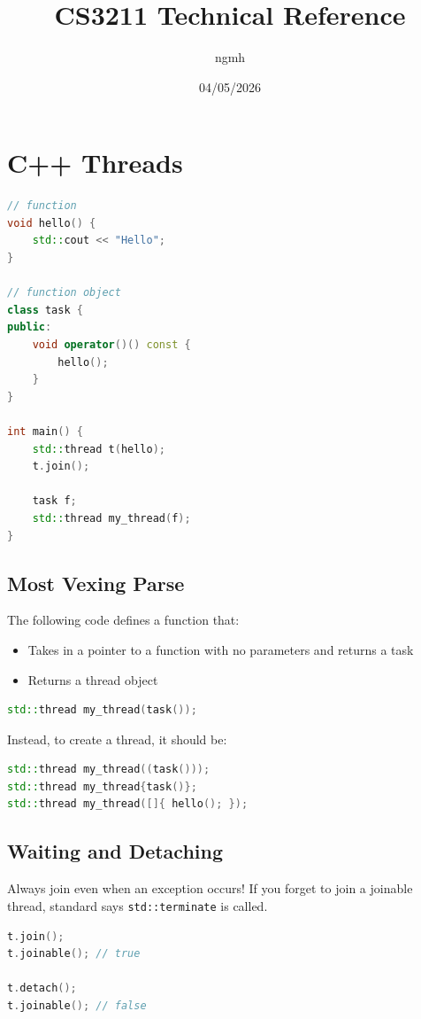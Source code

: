\documentclass{article}
\title{CS3211 Technical Reference}
\author{ngmh}
\date{04/05/2026}
\begin{document}
\large
\maketitle

\section{C++ Threads}
\begin{lstlisting}[language=C++]
// function
void hello() {
    std::cout << "Hello";
}

// function object
class task {
public:
    void operator()() const {
        hello();
    }
}

int main() {
    std::thread t(hello);
    t.join();

    task f;
    std::thread my_thread(f);
}

\end{lstlisting}

\subsection{Most Vexing Parse}
The following code defines a function that:
\begin{itemize}
    \item Takes in a pointer to a function with no parameters and returns a task
    \item Returns a thread object
\end{itemize}
\begin{lstlisting}[language=C++]
std::thread my_thread(task());
\end{lstlisting}

Instead, to create a thread, it should be:
\begin{lstlisting}[language=C++]
std::thread my_thread((task()));
std::thread my_thread{task()};
std::thread my_thread([]{ hello(); });
\end{lstlisting}

\subsection{Waiting and Detaching}
Always join even when an exception occurs! If you forget to join a joinable thread, standard says \verb|std::terminate| is called.
\begin{lstlisting}[language=C++]
t.join();
t.joinable(); // true

t.detach();
t.joinable(); // false
\end{lstlisting}
\end{document}
